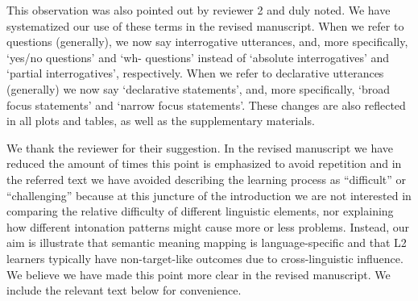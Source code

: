 \documentclass[]{article}
\newcommand{\TaskEstimationBox}[2]{%
\ifoptiondraft{\parbox{1.0\linewidth}{\hfill \hfill {\colorbox{#2}{\color{White} \textbf{#1}}}}}%
{}%
}
\def\Done {\TaskEstimationBox{Done}{Blue}}
\begin{document}
This observation was also pointed out by reviewer 2 and duly noted.
We have systematized our use of these terms in the revised manuscript.
When we refer to questions (generally), we now say interrogative utterances, and, more specifically, `yes/no questions' and `wh- questions' instead of `absolute interrogatives' and `partial interrogatives', respectively.
When we refer to declarative utterances (generally) we now say `declarative statements', and, more specifically, `broad focus statements' and `narrow focus statements'.
These changes are also reflected in all plots and tables, as well as the supplementary materials.

\Done


We thank the reviewer for their suggestion.
In the revised manuscript we have reduced the amount of times this point is emphasized to avoid repetition and in the referred text we have avoided describing the learning process as ``difficult'' or ``challenging'' because at this juncture of the introduction we are not interested in comparing the relative difficulty of different linguistic elements, nor explaining how different intonation patterns might cause more or less problems.
Instead, our aim is illustrate that semantic meaning mapping is language-specific and that L2 learners typically have non-target-like outcomes due to cross-linguistic influence.
We believe we have made this point more clear in the revised manuscript.
We include the relevant text below for convenience.
\end{document}
